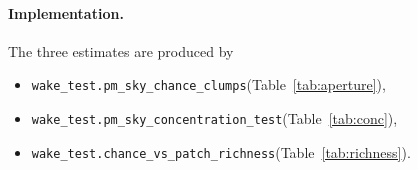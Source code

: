 \documentclass[11pt,a4paper]{article}
\begin{document}
\paragraph{Implementation.}
The three estimates are produced by
\begin{itemize}\itemsep0pt
\item \texttt{wake\_test.pm\_sky\_chance\_clumps}\quad(Table~\ref{tab:aperture}),
\item \texttt{wake\_test.pm\_sky\_concentration\_test}\quad(Table~\ref{tab:conc}),
\item \texttt{wake\_test.chance\_vs\_patch\_richness}\quad(Table~\ref{tab:richness}).
\end{itemize}
\end{document}
